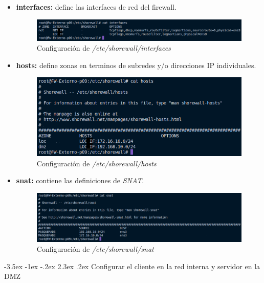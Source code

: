 \documentclass[11pt]{report}
\makeatletter
\renewcommand\chapter{\@startsection{chapter}{0}{\z@}%
    {-3.5ex \@plus -1ex \@minus -.2ex}%
    {2.3ex \@plus.2ex}%
    {\normalfont\Large\bfseries}}
\makeatother
\begin{document}
\begin{itemize}
  \item \textbf{interfaces:} define las interfaces de red del firewall.
  \begin{figure}[H]
    \centering
    \includegraphics[scale=0.65]{img/interfaces.png}
    \caption{Configuración de \emph{/etc/shorewall/interfaces}}
    \label{fig:Configuracion de /etc/shorewall/interfaces}
  \end{figure}
  \item \textbf{hosts:} define zonas en terminos de subredes y/o direcciones IP individuales.
  \begin{figure}[H]
    \centering
    \includegraphics[scale=0.7]{img/hosts.png}
    \caption{Configuración de \emph{/etc/shorewall/hosts}}
    \label{fig:Configuracion de /etc/shorewall/hosts}
  \end{figure}
  \item \textbf{snat:} contiene las definiciones de \emph{SNAT}. 
  \begin{figure}[H]
    \centering
    \includegraphics[scale=0.65]{img/snat_config.png}
    \caption{Configuración de \emph{/etc/shorewall/snat}}
    \label{fig:Configuracion de /etc/shorewall/snat}
  \end{figure}
\end{itemize}

\cleardoublepage

\chapter{Configurar el cliente en la red interna y servidor en la DMZ}
\end{document}
